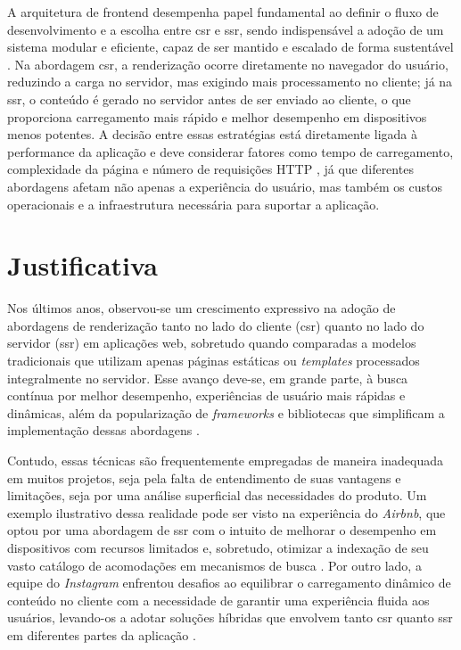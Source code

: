 A arquitetura de frontend desempenha papel fundamental ao definir o fluxo de desenvolvimento e a escolha entre \acrshort{csr} e \acrshort{ssr}, sendo indispensável a adoção de um sistema modular e eficiente, capaz de ser mantido e escalado de forma sustentável \cite{frontendGodbolt}. Na abordagem \acrshort{csr}, a renderização ocorre diretamente no navegador do usuário, reduzindo a carga no servidor, mas exigindo mais processamento no cliente; já na \acrshort{ssr}, o conteúdo é gerado no servidor antes de ser enviado ao cliente, o que proporciona carregamento mais rápido e melhor desempenho em dispositivos menos potentes. A decisão entre essas estratégias está diretamente ligada à performance da aplicação e deve considerar fatores como tempo de carregamento, complexidade da página e número de requisições HTTP \cite{webPerformance}, já que diferentes abordagens afetam não apenas a experiência do usuário, mas também os custos operacionais e a infraestrutura necessária para suportar a aplicação.

\section{Justificativa}

Nos últimos anos, observou-se um crescimento expressivo na adoção de abordagens de renderização tanto no lado do cliente (\acrshort{csr}) quanto no lado do servidor (\acrshort{ssr}) em aplicações web, sobretudo quando comparadas a modelos tradicionais que utilizam apenas páginas estáticas ou \emph{templates} processados integralmente no servidor. Esse avanço deve-se, em grande parte, à busca contínua por melhor desempenho, experiências de usuário mais rápidas e dinâmicas, além da popularização de \emph{frameworks} e bibliotecas que simplificam a implementação dessas abordagens \cite{atori2024}.

Contudo, essas técnicas são frequentemente empregadas de maneira inadequada em muitos projetos, seja pela falta de entendimento de suas vantagens e limitações, seja por uma análise superficial das necessidades do produto. Um exemplo ilustrativo dessa realidade pode ser visto na experiência do \emph{Airbnb}, que optou por uma abordagem de \acrshort{ssr} com o intuito de melhorar o desempenho em dispositivos com recursos limitados e, sobretudo, otimizar a indexação de seu vasto catálogo de acomodações em mecanismos de busca \cite{neary2017}. Por outro lado, a equipe do \emph{Instagram} enfrentou desafios ao equilibrar o carregamento dinâmico de conteúdo no cliente com a necessidade de garantir uma experiência fluida aos usuários, levando-os a adotar soluções híbridas que envolvem tanto \acrshort{csr} quanto \acrshort{ssr} em diferentes partes da aplicação \cite{conner2019}.

